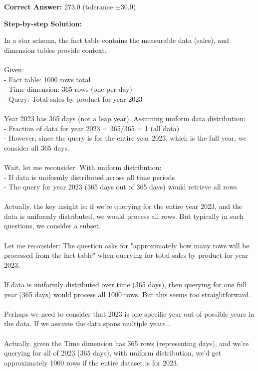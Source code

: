 \documentclass[11pt]{article}
\begin{document}
\textbf{Correct Answer:} 273.0 (tolerance \(\pm 30.0\))

\textbf{Step-by-step Solution:}

In a star schema, the fact table contains the measurable data (sales), and dimension tables provide context.\\
\\
Given:\\
- Fact table: 1000 rows total\\
- Time dimension: 365 rows (one per day)\\
- Query: Total sales by product for year 2023\\
\\
Year 2023 has 365 days (not a leap year). Assuming uniform data distribution:\\
- Fraction of data for year 2023 = 365/365 = 1 (all data)\\
- However, since the query is for the entire year 2023, which is the full year, we consider all 365 days.\\
\\
Wait, let me reconsider. With uniform distribution:\\
- If data is uniformly distributed across all time periods\\
- The query for year 2023 (365 days out of 365 days) would retrieve all rows\\
\\
Actually, the key insight is: if we're querying for the entire year 2023, and the data is uniformly distributed, we would process all rows. But typically in such questions, we consider a subset.\\
\\
Let me reconsider: The question asks for "approximately how many rows will be processed from the fact table" when querying for total sales by product for year 2023.\\
\\
If data is uniformly distributed over time (365 days), then querying for one full year (365 days) would process all 1000 rows. But this seems too straightforward.\\
\\
Perhaps we need to consider that 2023 is one specific year out of possible years in the data. If we assume the data spans multiple years...\\
\\
Actually, given the Time dimension has 365 rows (representing days), and we're querying for all of 2023 (365 days), with uniform distribution, we'd get approximately 1000 rows if the entire dataset is for 2023.\\
\end{document}
